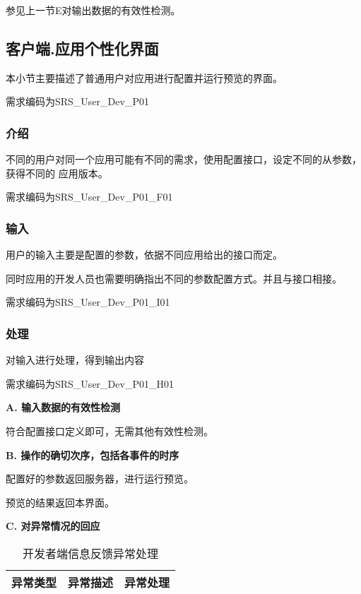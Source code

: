 参见上一节E对输出数据的有效性检测。



{\color{red}

\subsection{客户端.应用个性化界面}

本小节主要描述了普通用户对应用进行配置并运行预览的界面。

需求编码为SRS\_User\_Dev\_P01
\subsubsection{介绍}

不同的用户对同一个应用可能有不同的需求，使用配置接口，设定不同的从参数，获得不同的
应用版本。

需求编码为SRS\_User\_Dev\_P01\_F01

\subsubsection{输入}

用户的输入主要是配置的参数，依据不同应用给出的接口而定。

同时应用的开发人员也需要明确指出不同的参数配置方式。并且与接口相接。

需求编码为SRS\_User\_Dev\_P01\_I01


\subsubsection{处理}
对输入进行处理，得到输出内容

需求编码为SRS\_User\_Dev\_P01\_H01

\textbf{A. 输入数据的有效性检测}

符合配置接口定义即可，无需其他有效性检测。

\textbf{B. 操作的确切次序，包括各事件的时序}

配置好的参数返回服务器，进行运行预览。

预览的结果返回本界面。

\textbf{C. 对异常情况的回应}

\begin{longtable}{|c|p{6cm}|p{6cm}|}
\caption{开发者端信息反馈异常处理}\label{tab:client_info_exception}\\
\hline
\textbf{异常类型} & \textbf{异常描述} & \textbf{异常处理}\\
\hline
\endfirsthead


\end{longtable}}
